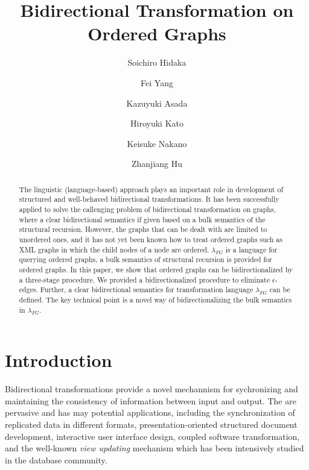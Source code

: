\documentclass{llncs}
\title{Bidirectional Transformation on Ordered Graphs}
\author{Soichiro Hidaka\inst{1}\and Fei Yang\inst{2}\and Kazuyuki Asada\inst{3}\and Hiroyuki Kato\inst{1}\and Keisuke Nakano\inst{3}\and Zhanjiang Hu\inst{1}}
\institute
{ National Institute of Informatics, Japan \\
  \email{\{hidaka,asada,kato,hu\}@nii.ac.jp}
\and BASICS, Department of Computer Science, Shanghai Jiao Tong University, China\\
  \email{iamyf@sjtu.edu.cn}
\and University of Electro-Communications, Japan\\
 \email{ksk@cs.uec.ac.jp}
}
\begin{document}
\maketitle


\begin{abstract}
The linguistic (language-based) approach plays an important role in development of structured and well-behaved bidirectional transformations. It has been successfully applied to solve the callenging problem of bidirectional transformation on graphs, where a clear bidirectional semantics if given based on a bulk semantics of the structural recursion. However, the graphs that can be dealt with are limited to unordered ones, and it has not yet been known how to treat ordered graphs such as XML graphs in which the child nodes of a node are ordered. $\lambda_{FG}$ is a language for querying ordered graphs, a bulk semantics of structural recursion is provided for ordered graphs. In this paper, we show that ordered graphs can be bidirectionalized by a three-stage procedure. We provided a bidirectionalized procedure to eliminate $\epsilon$-edges. Further, a clear bidirectional semantics for transformation language $\lambda_{FG}$ can be defined. The key technical point is a novel way of bidirectionalizing the bulk semantics in $\lambda_{FG}$.
\end{abstract}


\section{Introduction}\label{sec:intro}

Bidirectional transformations\cite{Foster2005,Czarnecki2009} provide a novel mechannism for sychronizing and maintaining the consistency of information between input and output. The are pervasive and has may potential applications, including the synchronization of replicated data in different formats\cite{Foster2005}, presentation-oriented structured document development, interactive user interface design\cite{Meertens1998}, coupled software transformation, and the well-known \emph{view updating} mechanism which has been intensively studied in the database community\cite{Bancilhon1981,Hegner1990}.
\end{document}
